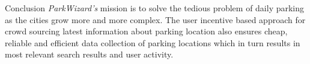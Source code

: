 \documentclass[final]{beamer}
\newlength{\onecolwid}
\begin{document}
\begin{frame}[t]
\begin{columns}[t]
\begin{column}{\onecolwid}


\begin{alertblock}{Conclusion}
\textit{ParkWizard's} mission is to solve the tedious problem of daily parking as the cities grow more and more complex. The user incentive based approach for crowd sourcing latest information about parking location also ensures cheap, reliable and efficient data collection of parking locations which in turn results in most relevant search results and user activity.
\end{alertblock}

\end{column} %

\end{columns} %

\end{frame} %
\end{document}
